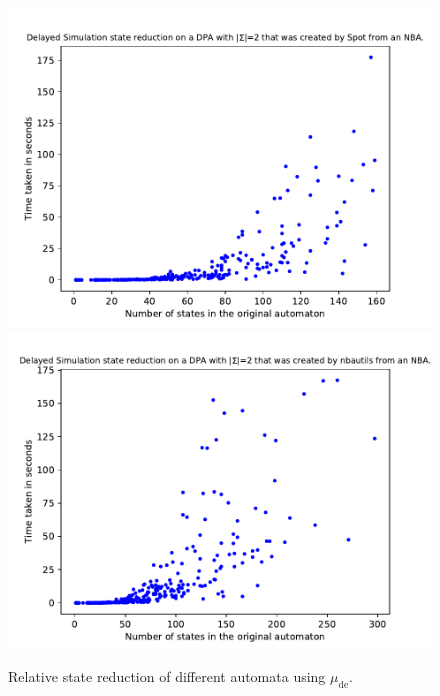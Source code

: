 \begin{figure}
\begin{minipage}{0.49\textwidth}
		\includegraphics[page=3,height=.3\textheight]{../data/analysis/fritzwilke/detspot_ap1.pdf} 
		\includegraphics[page=3,height=.3\textheight]{../data/analysis/fritzwilke/detnbaut_ap1.pdf} 
		\caption{Relative state reduction of different automata using $\mu_\text{de}$.}
		\label{fig:fritzwilke:empirical_reduct_rel}
	\end{minipage}
\end{figure}




